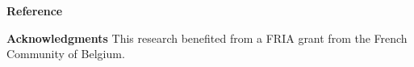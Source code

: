 \textbf{Reference}
\printbibliography[heading=none]

\textbf{Acknowledgments}
This research benefited from a FRIA grant from the French Community of Belgium.

